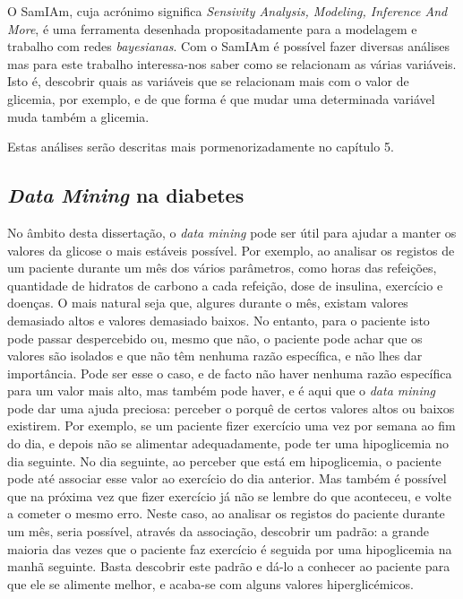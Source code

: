 O SamIAm, cuja acrónimo significa \textit{Sensivity Analysis, Modeling, Inference And More}, é uma ferramenta desenhada propositadamente para a modelagem e trabalho com redes \textit{bayesianas}. Com o SamIAm é possível fazer diversas análises mas para este trabalho interessa-nos saber como se relacionam as várias variáveis. Isto é, descobrir quais as variáveis que se relacionam mais com o valor de glicemia, por exemplo, e de que forma é que mudar uma determinada variável muda também a glicemia.

Estas análises serão descritas mais pormenorizadamente no capítulo 5.

\subsection{\textit{Data Mining} na diabetes}

No âmbito desta dissertação, o \textit{data mining} pode ser útil para ajudar a manter os valores da glicose o mais estáveis possível. Por exemplo, ao analisar os registos de um paciente durante um mês dos vários parâmetros, como horas das refeições, quantidade de hidratos de carbono a cada refeição, dose de insulina, exercício e doenças. O mais natural seja que, algures durante o mês, existam valores demasiado altos e valores demasiado baixos. 
No entanto, para o paciente isto pode passar despercebido ou, mesmo que não, o paciente pode achar que os valores são isolados e que não têm nenhuma razão específica, e não lhes dar importância. Pode ser esse o caso, e de facto não haver nenhuma razão específica para um valor mais alto, mas também pode haver, e é aqui que o \textit{data mining} pode dar uma ajuda preciosa:  perceber o porquê de certos valores altos ou baixos existirem. Por exemplo, se um paciente fizer exercício uma vez por semana ao fim do dia, e depois não se alimentar adequadamente, pode ter uma hipoglicemia no dia seguinte. No dia seguinte, ao perceber que está em hipoglicemia, o paciente pode até associar esse valor ao exercício do dia anterior. Mas também é possível que na próxima vez que fizer exercício já não se lembre do que aconteceu, e volte a cometer o mesmo erro. 
Neste caso, ao analisar os registos do paciente durante um mês, seria possível, através da associação, descobrir um padrão: a grande maioria das vezes que o paciente faz exercício é seguida por uma hipoglicemia na manhã seguinte. Basta descobrir este padrão e dá-lo a conhecer ao paciente para que ele se alimente melhor, e acaba-se com alguns valores hiperglicémicos. 

